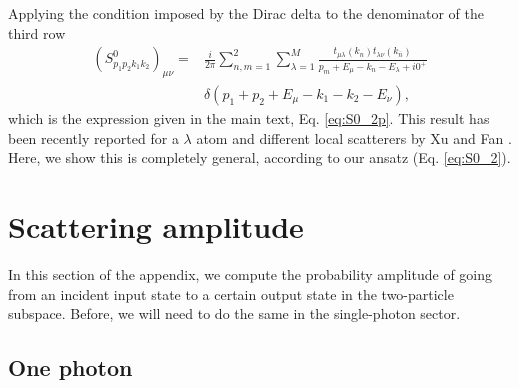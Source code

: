 \documentclass[aps,pra,reprint,amsmath,amssymb]{revtex4-1}
\begin{document}
Applying the condition imposed by the Dirac delta to the denominator of the third row
\begin{align}
(S_{p_1p_2k_1k_2}^0)_{\mu\nu}=  &\frac{i}{2\pi}\sum_{n,m=1}^2 \sum_{\lambda=1}^M  \frac{t_{\mu\lambda}(k_n) t_{\lambda\nu}(k_{\overline{n}})}{p_m+E_\mu -k_n -E_\lambda + i0^+}\nonumber\\
&\delta(p_1+p_2+E_\mu - k_1-k_2-E_\nu),
\end{align}
which is the expression given in the main text, Eq. \eqref{eq:S0_2p}. This result has been recently reported for a $\lambda$ atom and different local scatterers by Xu and Fan \cite{Xu2016}. Here, we show this is completely general, according to our ansatz (Eq. \eqref{eq:S0_2}).



\section{Scattering amplitude}\label{app:A}

In this section of the appendix, we compute the probability amplitude of going from an incident input state to a certain output state in the two-particle subspace. Before, we will need to do the same in the single-photon sector.

\subsection{One photon}
\end{document}
